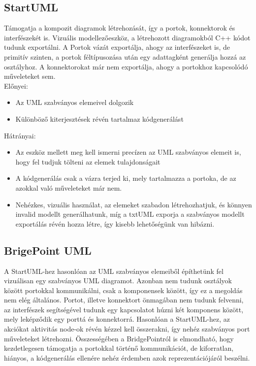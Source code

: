 \documentclass[a4paper,12pt]{report}
\begin{document}
\subsection{StartUML}
Támogatja a kompozit diagramok létrehozását, így a portok, konnektorok és interfészekét is. Vizuális modellezőeszköz, a létrehozott diagramokból C++ kódot tudunk exportálni. A Portok vázát exportálja, ahogy az interfészeket is, de primitív szinten, a portok féltípusozása után egy adattagként generálja hozzá az osztályhoz. A konnektorokat már nem exportálja, ahogy a portokhoz kapcsolódó műveleteket sem. \\
Előnyei:
\begin{itemize}
\item Az UML szabványos elemeivel dolgozik
\item Különböző kiterjesztések révén tartalmaz kódgenerálást
\end{itemize}
Hátrányai:
\begin{itemize}
\item Az eszköz mellett meg kell ismerni precízen az UML szabványos elemeit is, hogy fel tudjuk tölteni az elemek tulajdonságait
\item A kódgenerálás csak a vázra terjed ki, mely tartalmazza a portoka, de az azokkal való műveleteket már nem.
\item Nehézkes, vizuális használat, az elemeket szabadon létrehozhatjuk, és könnyen invalid modellt generálhatunk, míg a txtUML exporja a szabványos modellt exportálás révén hozza létre, így kisebb lehetőségünk van hibázni.
\end{itemize}

\subsection{BrigePoint UML}
A StartUML-hez hasonlóan az UML szabványos elemeiből építhetünk fel vizuálisan egy szabványos UML diagramot. Azonban nem tudunk osztályok között portokkal kommunikálni, csak a komponensek között, így ez a megoldás nem elég általános. Portot, illetve konnektort önmagában nem tudunk felvenni, az interfészek segítségével tudunk egy kapcsolatot húzni két komponens között, mely leképződik egy porttá és konnektorrá. Hasonlóan a StartUML-hez, az akciókat aktivitás node-ok révén kézzel kell összerakni, így nehéz szabványos port műveleteket létrehozni. Összességében a BridgePointról is elmondható, hogy kezdetlegesen támogatja a portokkal történő kommunikációt, de kiforratlan, hiányos, a kódgenerálás ellenére nehéz érdemben azok reprezentációjáról beszélni. 
\end{document}
